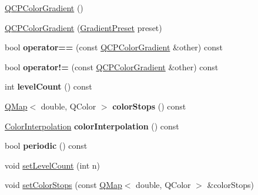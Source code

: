\begin{DoxyCompactItemize}
\item 
\hyperlink{class_q_c_p_color_gradient_a96bcc490ff9dc32b22941ce00800bce0}{Q\+C\+P\+Color\+Gradient} ()
\item 
\hyperlink{class_q_c_p_color_gradient_a4e570b4004fd60bd135e52d685ed2b66}{Q\+C\+P\+Color\+Gradient} (\hyperlink{class_q_c_p_color_gradient_aed6569828fee337023670272910c9072}{Gradient\+Preset} preset)
\item 
\mbox{\label{class_q_c_p_color_gradient_a7f3478c33c59aa3c03b9ea1f809877fa}} 
bool {\bfseries operator==} (const \hyperlink{class_q_c_p_color_gradient}{Q\+C\+P\+Color\+Gradient} \&other) const
\item 
\mbox{\label{class_q_c_p_color_gradient_ad26a10e3beaef4fc6f2553d1a9756087}} 
bool {\bfseries operator!=} (const \hyperlink{class_q_c_p_color_gradient}{Q\+C\+P\+Color\+Gradient} \&other) const
\item 
\mbox{\label{class_q_c_p_color_gradient_ac4b9d7034fc3b6c76318b05075367090}} 
int {\bfseries level\+Count} () const
\item 
\mbox{\label{class_q_c_p_color_gradient_aaab19729e921682401044ac8e518ff02}} 
\hyperlink{class_q_map}{Q\+Map}$<$ double, Q\+Color $>$ {\bfseries color\+Stops} () const
\item 
\mbox{\label{class_q_c_p_color_gradient_abad5002858db8cf75ecb045200881de6}} 
\hyperlink{class_q_c_p_color_gradient_ac5dca17cc24336e6ca176610e7f77fc1}{Color\+Interpolation} {\bfseries color\+Interpolation} () const
\item 
\mbox{\label{class_q_c_p_color_gradient_a22a1d2b17f203caf0dcec833507fb9e0}} 
bool {\bfseries periodic} () const
\item 
void \hyperlink{class_q_c_p_color_gradient_a18da587eb4f7fc788ea28ba15b6a12de}{set\+Level\+Count} (int n)
\item 
void \hyperlink{class_q_c_p_color_gradient_a724e828aa6f0ba5011a9392477c35d3a}{set\+Color\+Stops} (const \hyperlink{class_q_map}{Q\+Map}$<$ double, Q\+Color $>$ \&color\+Stops)
\item 

\end{DoxyCompactItemize}
